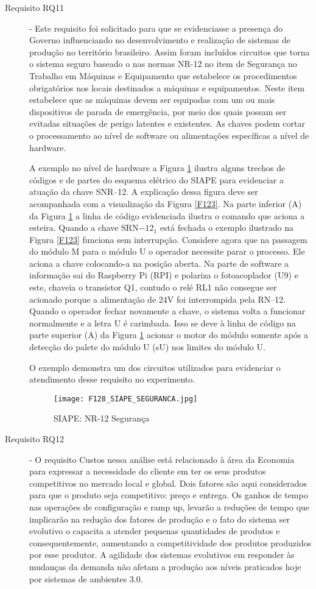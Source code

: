 \begin{description}
	\item[Requisito RQ11] - Este requisito foi solicitado para que se evidenciasse a presença do Governo influenciando no desenvolvimento e realização de sistemas de produção no território brasileiro. Assim foram incluídos circuitos que torna o sistema seguro baseado o nas normas NR-12 no item de Segurança no Trabalho em Máquinas e Equipamento que estabelece os procedimentos obrigatórios nos locais destinados a máquinas e equipamentos. Neste item estabelece que as máquinas devem ser equipadas com um ou mais dispositivos de parada de emergência, por meio dos quais possam ser evitadas situações de perigo latentes e existentes. As chaves podem cortar o processamento ao nível de software ou alimentações específicas a nível de hardware. \par 
	A exemplo no nível de hardware a Figura \ref{F128} ilustra alguns trechos de códigos e de partes do esquema elétrico do SIAPE para evidenciar  a atuação da chave SNR--12. A explicação dessa figura deve ser acompanhada com a visualização da Figura \ref{F123}. Na parte inferior (A) da Figura \ref{F128}  a linha de código evidenciada ilustra o comando que aciona a esteira. Quando a chave SRN$-12_1$ está fechada o exemplo ilustrado na Figura \ref{F123} funciona sem interrupção. Considere agora que na passagem do módulo M para o módulo U o operador necessite parar o processo. Ele aciona a chave colocando-a na posição aberta. Na parte de software a informação sai do Raspberry Pi (RPI) e polariza o fotoacoplador (U9) e este, chaveia o transistor Q1, contudo o relé RL1 não consegue ser acionado porque a alimentação de 24V foi interrompida pela RN--12. Quando o operador fechar novamente a chave, o sistema volta a funcionar normalmente e a letra U é carimbada. Isso se deve à linha de código na parte superior (A) da Figura \ref{F128} acionar o motor do módulo somente após a detecção do palete do módulo U (sU) nos limites do módulo U.\par 
	O exemplo demonstra um dos circuitos utilizados para evidenciar o atendimento desse requisito no experimento. 
	
	
		\begin{figure}[h]
			\centering
			\texttt{[image: F128\_SIAPE\_SEGURANCA.jpg]} 
			\caption{SIAPE: NR-12 Segurança}
			\label{F128}
		\end{figure}	
	
	\item[Requisito RQ12] - O requisito Custos nessa análise está relacionado à área da Economia para expressar a necessidade do cliente em ter os seus produtos competitivos no mercado local e global. Dois fatores são aqui considerados para que o produto seja competitivo: preço e entrega. Os ganhos de tempo nas operações de configuração e ramp up, levarão a reduções de tempo que implicarão na redução dos fatores de produção e o fato do sistema ser evolutivo o capacita a atender pequenas quantidades de produtos e consequentemente, aumentando a competitividade dos produtos produzidos por esse produtor. A agilidade dos sistemas evolutivos em responder às mudanças da demanda não afetam a produção aos níveis praticados hoje por sistemas de ambientes 3.0.
	

\end{description}
